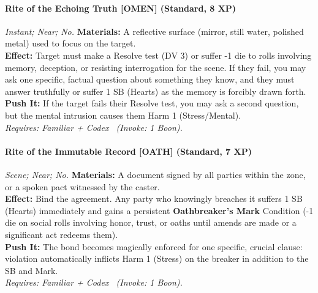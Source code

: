 \paragraph{Rite of the Echoing Truth \textnormal{[OMEN]} (Standard, 8 XP)} \emph{Instant; Near; No.}
\textbf{Materials:} A reflective surface (mirror, still water, polished metal) used to focus on the target.\\
\textbf{Effect:} Target must make a Resolve test (DV 3) or suffer -1 die to rolls involving memory, deception, or resisting interrogation for the scene. If they fail, you may ask one specific, factual question about something they know, and they must answer truthfully or suffer 1 SB (Hearts) as the memory is forcibly drawn forth.\\
\textbf{Push It:} If the target fails their Resolve test, you may ask a second question, but the mental intrusion causes them Harm 1 (Stress/Mental).\\
\emph{Requires: Familiar + Codex \ (\textit{Invoke:} 1 Boon).}

\paragraph{Rite of the Immutable Record \textnormal{[OATH]} (Standard, 7 XP)} \emph{Scene; Near; No.}
\textbf{Materials:} A document signed by all parties within the zone, or a spoken pact witnessed by the caster.\\
\textbf{Effect:} Bind the agreement. Any party who knowingly breaches it suffers 1 SB (Hearts) immediately and gains a persistent \textbf{Oathbreaker's Mark} Condition (-1 die on social rolls involving honor, trust, or oaths until amends are made or a significant act redeems them).\\
\textbf{Push It:} The bond becomes magically enforced for one specific, crucial clause: violation automatically inflicts Harm 1 (Stress) on the breaker in addition to the SB and Mark.\\
\emph{Requires: Familiar + Codex \ (\textit{Invoke:} 1 Boon).}

